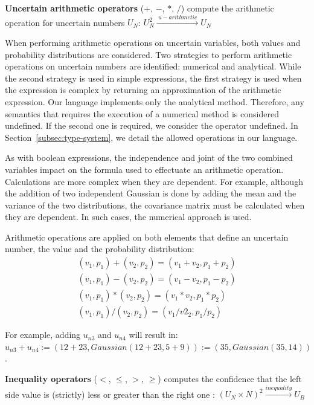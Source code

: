 \bigskip

\begin{operator}
    \textbf{Uncertain arithmetic operators} ($+$, $-$, $*$, $/$) compute the arithmetic operation for uncertain numbers $U_N$: $U_N^2 \xrightarrow{~u-arithmetic~} U_N$
\end{operator}
When performing arithmetic operations on uncertain variables, both values and probability distributions are considered.
Two strategies to perform arithmetic operations on uncertain numbers are identified: numerical and analytical.
While the second strategy is used in simple expressions, the first strategy is used when the expression is complex by returning an approximation of the arithmetic expression. 
Our language implements only the analytical method.
Therefore, any semantics that requires the execution of a numerical method is considered undefined.
If the second one is required, we consider the operator undefined.
In Section~\ref{subsec:type-system}, we detail the allowed operations in our language.

As with boolean expressions, the independence and joint of the two combined variables impact on the formula used to effectuate an arithmetic operation.
Calculations are more complex when they are dependent.
For example, although the addition of two independent Gaussian is done by adding the mean and the variance of the two distributions, the covariance matrix must be calculated when they are dependent.
In such cases, the numerical approach is used.

Arithmetic operations are applied on both elements that define an uncertain number, the value and the probability distribution:
\begin{align*}
	(v_1,p_1) + (v_2,p_2) = (v_1 + v_2, p_1 + p_2)\\
	(v_1,p_1) - (v_2,p_2) = (v_1 - v_2, p_1 - p_2)\\
	(v_1,p_1) * (v_2,p_2) = (v_1 * v_2, p_1 * p_2)\\
	(v_1,p_1) / (v_2,p_2) = (v_1 / v2_2, p_1 / p_2)
\end{align*}

For example, adding $u_{n3}$ and $u_{n4}$ will result in: $u_{n3} + u_{n4} := (12+23, Gaussian(12+23, 5+9)) := (35, Gaussian(35, 14))$.

\bigskip

\begin{operator}
	\textbf{Inequality operators} ($<$, $\leqslant$, $>$, $\geqslant$) computes the confidence that the left side value is (strictly) less or greater than the right one : $(U_N \times N)^2 \xrightarrow{inequality} U_B$
\end{operator}

